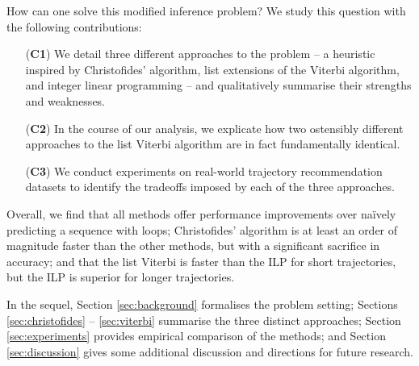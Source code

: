 How can one solve this modified inference problem?
We study this question with the following contributions:
\begin{enumerate}
	\item[(\textbf{C1})] We detail three different approaches to the problem -- a heuristic inspired by Christofides' algorithm, list extensions of the Viterbi algorithm, and integer linear programming -- and qualitatively summarise their strengths and weaknesses.
	\item[(\textbf{C2})] In the course of our analysis, we explicate how two ostensibly different approaches to the list Viterbi algorithm \citep{seshadri1994list,nilsson2001sequentially} are in fact fundamentally identical.
	\item[(\textbf{C3})] We conduct experiments on real-world trajectory recommendation datasets to identify the tradeoffs imposed by each of the three approaches.
\end{enumerate}
Overall, we find that
all methods offer performance improvements over na\"{i}vely predicting a sequence with loops;
Christofides' algorithm is at least an order of magnitude faster than the other methods, but with a significant sacrifice in accuracy;
and that the list Viterbi is faster than the ILP for short trajectories, but the ILP is superior for longer trajectories.

In the sequel,
Section \ref{sec:background} formalises the problem setting;
Sections \ref{sec:christofides} -- \ref{sec:viterbi} summarise the three distinct approaches;
Section \ref{sec:experiments} provides empirical comparison of the methods;
and Section \ref{sec:discussion} gives some additional discussion and directions for future research.
